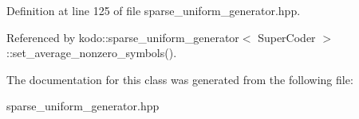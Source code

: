 Definition at line 125 of file sparse\-\_\-uniform\-\_\-generator.\-hpp.



Referenced by kodo\-::sparse\-\_\-uniform\-\_\-generator$<$ Super\-Coder $>$\-::set\-\_\-average\-\_\-nonzero\-\_\-symbols().



The documentation for this class was generated from the following file\-:\begin{DoxyCompactItemize}
\item 
sparse\-\_\-uniform\-\_\-generator.\-hpp\end{DoxyCompactItemize}
